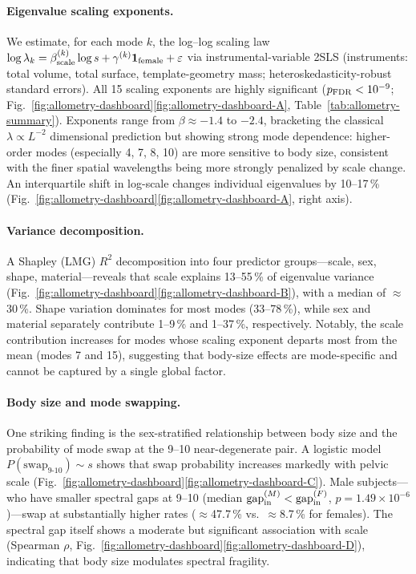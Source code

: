 \documentclass[11pt]{article}
\begin{document}
\paragraph{Eigenvalue scaling exponents.}
We estimate, for each mode $k$, the log--log scaling law $\log\lambda_k = \beta_{\rm scale}^{(k)}\log s + \gamma^{(k)}\mathbf{1}_{\rm female} + \varepsilon$ via instrumental-variable 2SLS (instruments: total volume, total surface, template-geometry mass; heteroskedasticity-robust standard errors).
All 15 scaling exponents are highly significant ($p_{\rm FDR} < 10^{-9}$; Fig.~\ref{fig:allometry-dashboard}\ref{fig:allometry-dashboard-A}, Table~\ref{tab:allometry-summary}).
Exponents range from $\beta \approx -1.4$ to $-2.4$, bracketing the classical $\lambda \propto L^{-2}$ dimensional prediction but showing strong mode dependence:
higher-order modes (especially 4, 7, 8, 10) are more sensitive to body size, consistent with the finer spatial wavelengths being more strongly penalized by scale change.
An interquartile shift in log-scale changes individual eigenvalues by 10--17\,\% (Fig.~\ref{fig:allometry-dashboard}\ref{fig:allometry-dashboard-A}, right axis).

\paragraph{Variance decomposition.}
A Shapley (LMG) $R^2$ decomposition into four predictor groups---scale, sex, shape, material---reveals that scale explains 13--55\,\% of eigenvalue variance (Fig.~\ref{fig:allometry-dashboard}\ref{fig:allometry-dashboard-B}), with a median of $\approx$30\,\%.
Shape variation dominates for most modes (33--78\,\%), while sex and material separately contribute 1--9\,\% and 1--37\,\%, respectively.
Notably, the scale contribution increases for modes whose scaling exponent departs most from the mean (modes 7 and 15), suggesting that body-size effects are mode-specific and cannot be captured by a single global factor.

\paragraph{Body size and mode swapping.}
One striking finding is the sex-stratified relationship between body size and the probability of mode swap at the 9--10 near-degenerate pair.
A logistic model $P(\mathrm{swap}_{9{\text{-}}10}) \sim s$ shows that swap probability increases markedly with pelvic scale (Fig.~\ref{fig:allometry-dashboard}\ref{fig:allometry-dashboard-C}).
Male subjects---who have smaller spectral gaps at 9--10 (median $\mathrm{gap}_{\rm in}^{(M)} < \mathrm{gap}_{\rm in}^{(F)}$, $p = 1.49\times 10^{-6}$)---swap at substantially higher rates ($\approx$47.7\,\% vs.\ $\approx$8.7\,\% for females).
The spectral gap itself shows a moderate but significant association with scale (Spearman $\rho$, Fig.~\ref{fig:allometry-dashboard}\ref{fig:allometry-dashboard-D}), indicating that body size modulates spectral fragility.
\end{document}
